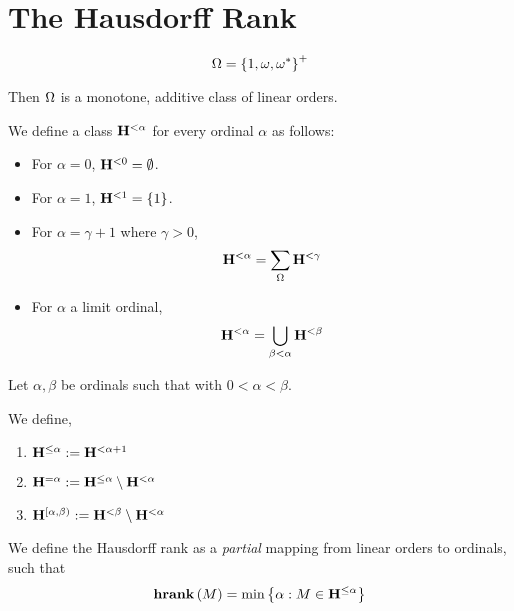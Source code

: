 \section{The Hausdorff Rank}

\begin{definition}
  \[
    \Omega = \left\{ {1, \omega, \omega^\ast} \right\}^+
  \]
\end{definition}

\begin{observation}
  Then $\Omega$ is a monotone, additive class of linear orders.
\end{observation}

\begin{definition}
  We define a class $\mathbf{H}^{< \alpha}$
  for every ordinal $\alpha$ as follows:

  \begin{itemize}
    \item For $\alpha = 0$, $\mathbf{H}^{< 0} = \emptyset$.
    \item For $\alpha = 1$, $\mathbf{H}^{< 1} = \left\{ {1} \right\}$.
    \item For $\alpha = \gamma + 1$ where $\gamma > 0$,
          \[\mathbf{H}^{< \alpha} = \sum_{\Omega}{\mathbf{H}^{< \gamma}}\]
    \item For $\alpha$ a limit ordinal,
          \[\mathbf{H}^{< \alpha} = \bigcup_{\beta < \alpha} \mathbf{H}^{< \beta}\]
  \end{itemize}

\end{definition}

\begin{definition}
  Let $\alpha, \beta$ be ordinals such that with $0 < \alpha < \beta$.

  We define,
  \begin{enumerate}
    \item $\mathbf{H}^{\le \alpha} := \mathbf{H}^{< \alpha + 1}$
    \item $\mathbf{H}^{= \alpha} := \mathbf{H}^{\le \alpha} \setminus \mathbf{H}^{< \alpha}$
    \item $\mathbf{H}^{[\alpha, \beta)} := \mathbf{H}^{< \beta} \setminus \mathbf{H}^{< \alpha}$
  \end{enumerate}
\end{definition}

\begin{definition}
  We define the Hausdorff rank as a \emph{partial} mapping
  from linear orders to ordinals, such that
  \[
    \mathbf{hrank} \left( {M} \right) = \min \left\{ {\alpha : M \in \mathbf{H}^{\le \alpha}} \right\}
  \]

\end{definition}



